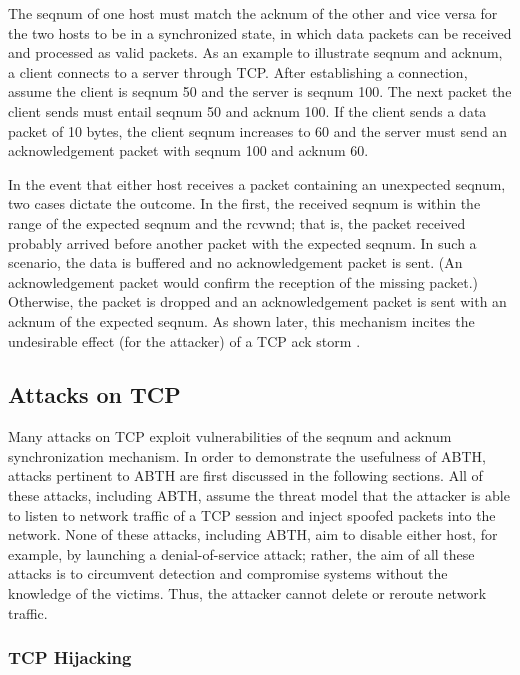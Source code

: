 \documentclass{sig-alternate}
\begin{document}
The seqnum of one host must match the acknum of the other and vice versa for the two hosts to be in a synchronized state, in which data packets can be received and processed as valid packets.
As an example to illustrate seqnum and acknum, a client connects to a server through TCP. After establishing a connection, assume the client is seqnum 50 and the server is seqnum 100.
The next packet the client sends must entail seqnum 50 and acknum 100.
If the client sends a data packet of 10 bytes, the client seqnum increases to 60 and the server must send an acknowledgement packet with seqnum 100 and acknum 60.

In the event that either host receives a packet containing an unexpected seqnum, two cases dictate the outcome.
In the first, the received seqnum is within the range of the expected seqnum and the rcvwnd; that is, the packet received probably arrived before another packet with the expected seqnum.
In such a scenario, the data is buffered and no acknowledgement packet is sent. (An acknowledgement packet would confirm the reception of the missing packet.)
Otherwise, the packet is dropped and an acknowledgement packet is sent with an acknum of the expected seqnum.
As shown later, this mechanism incites the undesirable effect (for the attacker) of a TCP ack storm \cite{anderson:ackstorm}.

\subsection{Attacks on TCP}

Many attacks on TCP exploit vulnerabilities of the seqnum and acknum synchronization mechanism.
In order to demonstrate the usefulness of ABTH, attacks pertinent to ABTH are first discussed in the following sections.
All of these attacks, including ABTH, assume the threat model that the attacker is able to listen to network traffic of a TCP session and inject spoofed packets into the network.
None of these attacks, including ABTH, aim to disable either host, for example, by launching a denial-of-service attack; rather, the aim of all these attacks is to circumvent detection and compromise systems without the knowledge of the victims.
Thus, the attacker cannot delete or reroute network traffic.

\subsubsection{TCP Hijacking}
\end{document}
